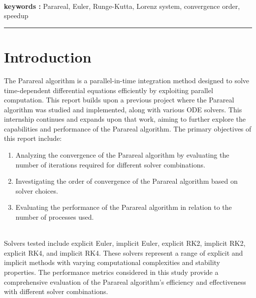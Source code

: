 \documentclass[a4paper,12pt,french]{article}
\begin{document}
\\

{\noindent\textbf{keywords :}}
Parareal, Euler, Runge-Kutta, Lorenz system, convergence order, speedup
\\
\noindent\rule[2pt]{\textwidth}{0.5pt}

\vspace*{\fill}
\newpage


\thispagestyle{empty}
\tableofcontents
\newpage
\listoffigures
\listofalgorithms
\newpage
\section{Introduction}
The Parareal algorithm is a parallel-in-time integration method designed to solve time-dependent differential equations efficiently by exploiting parallel computation. This report builds upon a previous project where the Parareal algorithm was studied and implemented, along with various ODE solvers. This internship continues and expands upon that work, aiming to further explore the capabilities and performance of the Parareal algorithm.
\newline
\newline
The primary objectives of this report include:
\begin{enumerate}
    \item Analyzing the convergence of the Parareal algorithm by evaluating the number of iterations required for different solver combinations.
    \item Investigating the order of convergence of the Parareal algorithm based on solver choices.
    \item Evaluating the performance of the Parareal algorithm in relation to the number of processes used.
\end{enumerate}\\

Solvers tested include explicit Euler, implicit Euler, explicit RK2, implicit RK2, explicit RK4, and implicit RK4. These solvers represent a range of explicit and implicit methods with varying computational complexities and stability properties. The performance metrics considered in this study provide a comprehensive evaluation of the Parareal algorithm’s efficiency and effectiveness with different solver combinations.
\end{document}
